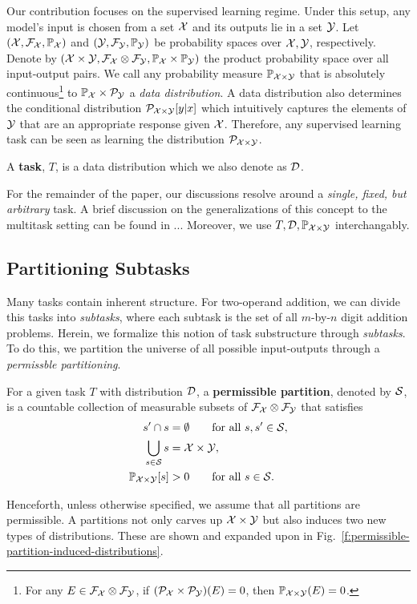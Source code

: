 Our contribution focuses on the supervised learning regime. Under this setup,
any model's input is chosen from a set $\mathcal{X}$ and its outputs lie in a set
$\mathcal{Y}$. Let $(\mathcal{X}, \mathcal{F}_{\mathcal{X}}, \mathbb{P}_{\mathcal{X}})$ and $(\mathcal{Y}, \mathcal{F}_{\mathcal{Y}}, \mathbb{P}_{\mathcal{Y}})$ be
probability spaces over $\mathcal{X}, \mathcal{Y}$, respectively. 
Denote by $(\mathcal{X} \times \mathcal{Y},
\mathcal{F}_{\mathcal{X}} \otimes \mathcal{F}_{\mathcal{Y}}, \mathbb{P}_{\mathcal{X}} \times \mathbb{P}_{\mathcal{Y}})$ the product probability
space over all input-output pairs. We call any probability measure 
$\mathbb{P}_{\mathcal{X}\times\mathcal{Y}}$ that is absolutely continuous\footnote{For any
$E \in \mathcal{F}_{\mathcal{X}}\otimes \mathcal{F}_{\mathcal{Y}}$, if $(\mathcal{P}_{\mathcal{X}} \times \mathcal{P}_{\mathcal{Y}})(E) = 0$,
then $\mathbb{P}_{\mathcal{X}\times\mathcal{Y}}(E) = 0$.} to 
$\mathbb{P}_{\mathcal{X}} \times \mathcal{P}_{\mathcal{Y}}$ a \textit{data distribution}. A data distribution
also determines the conditional distribution $\mathcal{P}_{\mathcal{X}\times\mathcal{Y}}[y | x]$
which intuitively captures the elements of $\mathcal{Y}$ that are an appropriate
response given $\mathcal{X}$. Therefore, any supervised learning task can be 
seen as learning the distribution $\mathcal{P}_{\mathcal{X}\times\mathcal{Y}}$. 
\begin{defn}[Task]\label{d:task}
A \textbf{task}, $T$, is a data distribution which we also denote as
$\mathcal{D}$.
\end{defn}
For the remainder of the paper, our discussions resolve around a \textit{
single, fixed, but arbitrary}
 task.  A brief discussion on the generalizations of
this concept to the multitask setting can be found in ...
Moreover, we use $T, \mathcal{D}, \mathbb{P}_{\mathcal{X}\times\mathcal{Y}}$ interchangably.

\subsection{Partitioning Subtasks}\label{s:partitioning-subtasks}
Many tasks contain inherent structure. For two-operand addition, we can
divide this tasks into \textit{subtasks}, where each subtask is the
set of all $m$-by-$n$ digit addition problems. Herein, we formalize
this notion of task substructure through \textit{subtasks}. To do
this, we partition the universe of all possible input-outputs through a 
\textit{permissble partitioning}.
\begin{defn}\label{d:permissible}
For a given task $T$ with distribution $\mathcal{D}$, a \textbf{permissible partition},
denoted by $\mathcal{S}$, is a countable collection of measurable subsets of 
$\mathcal{F}_{\mathcal{X}}\otimes \mathcal{F}_{\mathcal{Y}}$ that satisfies
\begin{align}
s' \cap s &= \emptyset \qquad \text{for all}~s,s' \in \mathcal{S},\\
\bigcup_{s\in \mathcal{S}} s &= \mathcal{X} \times \mathcal{Y}, \\
\mathbb{P}_{\mathcal{X}\times\mathcal{Y}}[s] &> 0 \qquad \text{for all}~s \in \mathcal{S}.
\end{align}
\end{defn}
Henceforth, unless otherwise specified, we assume that all partitions are 
permissible. A partitions not only carves up $\mathcal{X} \times \mathcal{Y}$ but also
induces two new types of distributions. These are shown and expanded upon
in Fig.~\ref{f:permissible-partition-induced-distributions}.


